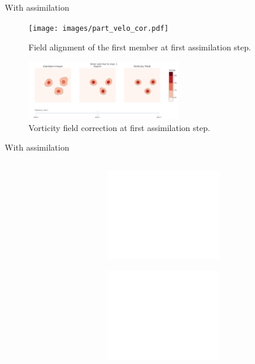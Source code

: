 \documentclass[aspectratio=169]{beamer} %
\begin{document}
\begin{frame}{With assimilation}
    \begin{figure}
        \centering
        \texttt{[image: images/part\_velo\_cor.pdf]}
        \caption*{\tiny Field alignment of the first member at first assimilation step.}
    \end{figure}
    \begin{figure}
        \centering
        \includegraphics[width=0.6\textwidth]{images/mean_vorticity.pdf}
        \caption*{\tiny Vorticity field correction at first assimilation step.}
    \end{figure}
\end{frame}

\begin{frame}{With assimilation}
    \vspace{-0.5cm}
    \begin{columns}
        \begin{column}{0.5\textwidth}
            \begin{figure}
                \centering
            \end{figure}
        \end{column}
        \begin{column}{0.5\textwidth}
            \begin{figure}
                \centering
                \begin{subfigure}{\textwidth}
                    \centering
                    \includegraphics<2->[width=0.75\textwidth]{images/error_position_w_assim.pdf}
                \end{subfigure}
                \begin{subfigure}{\textwidth}
                    \centering
                    \includegraphics<2->[width=0.75\textwidth]{images/error_vorticity_w_assim.pdf}
                \end{subfigure}
            \end{figure}
        \end{column}
    \end{columns}
\end{frame}
\end{document}
